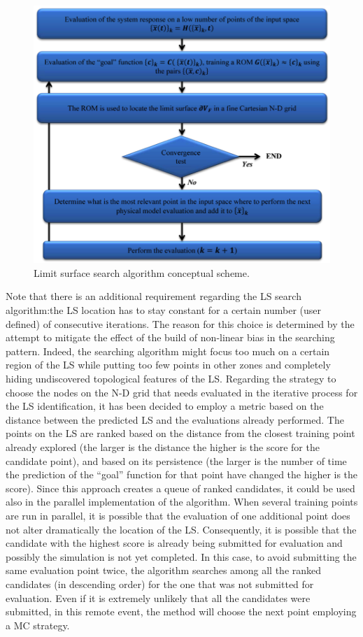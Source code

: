 \begin{figure}[h!]
  \centering
  \includegraphics[width=1.0\textwidth]  {pics/LimitSurfaceAlgoFlow.png}
  \caption{Limit surface search algorithm conceptual scheme.}
  \label{fig:LimitSurfaceAlgoFlow}
\end{figure}
Note that there is an additional requirement 
regarding the LS search algorithm:the LS location 
has to stay constant for a certain number (user defined) of consecutive 
iterations. The reason for this choice is determined by the attempt to 
mitigate the effect of the build of non-linear bias in the searching 
pattern. Indeed, the searching algorithm might focus too much on a 
certain region of the LS while putting too few points in other zones 
and completely hiding undiscovered topological features of the LS.
Regarding the strategy to choose the nodes on the N-D grid that 
needs evaluated in the iterative process for the LS identification, it has
been decided to employ a metric based on the 
distance between the predicted LS and the evaluations already 
performed. The points on the LS are ranked based on the distance 
from the closest training point already explored (the larger is the 
distance the higher is the score for the candidate point), and based on 
its persistence (the larger is the number of time the prediction of the 
``goal'' function for that point have changed the higher is the score).
Since this approach creates a queue of ranked candidates, it could be 
used also in the parallel implementation of the algorithm. When 
several training points are run in parallel, it is possible that the 
evaluation of one additional point does not alter dramatically the 
location of the LS. Consequently, it is possible that the candidate with 
the highest score is already being submitted for evaluation and 
possibly the simulation is not yet completed. In this case, to avoid 
submitting the same evaluation point twice, the algorithm searches 
among all the ranked candidates (in descending order) for the one 
that was not submitted for evaluation. Even if it is extremely unlikely 
that all the candidates were submitted, in this remote event, the 
method will choose the next point employing a MC strategy.

